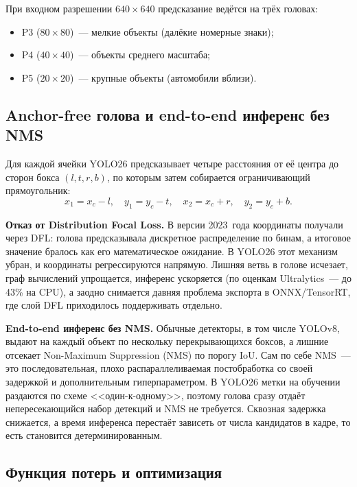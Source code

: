 \documentclass[10pt,a4paper]{report}
\numberwithin{equation}{chapter}
\numberwithin{figure}{chapter}
\numberwithin{table}{chapter}
\begin{document}
При входном разрешении $640\times640$ предсказание ведётся на трёх
головах:
\begin{itemize}[nosep]
  \item P3 ($80\times80$)~--- мелкие объекты (далёкие номерные знаки);
  \item P4 ($40\times40$)~--- объекты среднего масштаба;
  \item P5 ($20\times20$)~--- крупные объекты (автомобили вблизи).
\end{itemize}

\subsection{Anchor-free голова и end-to-end инференс без NMS}
\label{subsec:anchor_free}

Для каждой ячейки YOLO26 предсказывает четыре расстояния от её центра
до сторон бокса $(l, t, r, b)$, по которым затем собирается
ограничивающий прямоугольник:
\begin{equation}
  x_1 = x_c - l,\quad y_1 = y_c - t,\quad
  x_2 = x_c + r,\quad y_2 = y_c + b.
\end{equation}

\textbf{Отказ от Distribution Focal Loss.} В версии 2023~года координаты
получали через DFL: голова предсказывала дискретное распределение по
бинам, а итоговое значение бралось как его математическое ожидание.
В YOLO26 этот механизм убран, и координаты регрессируются напрямую.
Лишняя ветвь в голове исчезает, граф вычислений упрощается, инференс
ускоряется (по оценкам Ultralytics~--- до 43\% на CPU), а заодно
снимается давняя проблема экспорта в ONNX/TensorRT, где слой DFL
приходилось поддерживать отдельно.

\textbf{End-to-end инференс без NMS.} Обычные детекторы, в том числе
YOLOv8, выдают на каждый объект по нескольку перекрывающихся боксов, а
лишние отсекает Non-Maximum Suppression (NMS) по порогу IoU. Сам по себе
NMS~--- это последовательная, плохо распараллеливаемая постобработка со
своей задержкой и дополнительным гиперпараметром. В YOLO26 метки на
обучении раздаются по схеме <<один-к-одному>>, поэтому голова сразу
отдаёт непересекающийся набор детекций и NMS не требуется. Сквозная
задержка снижается, а время инференса перестаёт зависеть от числа
кандидатов в кадре, то есть становится детерминированным.

\subsection{Функция потерь и оптимизация}
\label{subsec:yolo_loss}
\end{document}
